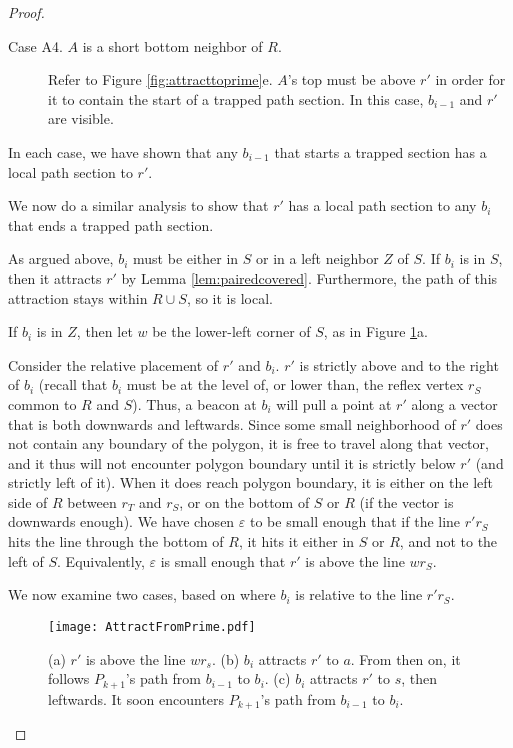 \documentclass{article}
\begin{document}
\begin{proof}
\begin{description}
		\item[Case A4. $A$ is a short bottom neighbor of $R$.]
			Refer to Figure \ref{fig:attracttoprime}e. 
			$A$'s top must be above $r'$ in order
			for it to contain the start of a trapped path section.
			In this case, $b_{i-1}$ and $r'$ are visible.
		\end{description}
		
		In each case, we have shown that any $b_{i-1}$ that starts a trapped section
		has a local path section to $r'$.
		
		We now do a similar analysis to show that $r'$ has a local path section to
		any $b_i$ that ends a trapped path section.
		
		As argued above, $b_i$ must be either in $S$ or in a left neighbor $Z$ of $S$.
		If $b_i$ is in $S$, then it attracts $r'$ by Lemma \ref{lem:pairedcovered}.
		Furthermore, the path of this attraction stays within $R \cup S$, so it is
		local.
		
		If $b_i$ is in $Z$, then 
		let $w$ be the lower-left corner of $S$, as in Figure
		\ref{fig:attractfromprime}a.
		
		Consider the relative placement of $r'$ and $b_i$.
		$r'$ is strictly above and to the right of $b_i$
		(recall that $b_i$ must be at the level of, or lower than,
		the reflex vertex $r_S$ common to $R$ and $S$).
		Thus, a beacon at $b_i$ will pull a point at $r'$ along a vector
		that is both downwards and leftwards.
		Since some small neighborhood of $r'$ does not contain any boundary of the
		polygon,
		it is free to travel along that vector, and it thus will not encounter
		polygon boundary until it is strictly below $r'$ (and strictly left of it).
		When it does reach polygon boundary, it is either on the left side of $R$
		between $r_T$ and $r_S$, or on the bottom of $S$ or $R$ (if the vector is
		downwards enough).  We have chosen $\varepsilon$ to be small enough that if
		the line $r'r_S$ hits the line through the bottom of $R$, it hits it 
		either in $S$ or $R$, and not to the left of $S$.
		Equivalently, $\varepsilon$ is small enough that $r'$ is above the line
		$wr_S$.
		
		We now examine two cases, based on where $b_i$ is relative to the line $r'r_S$.
		
		\begin{figure}[htbp] 
			\begin{center}
				\texttt{[image: AttractFromPrime.pdf]} 
			\end{center}
			\caption{
				(a) $r'$ is above the line $wr_s$. 
				(b) $b_i$ attracts $r'$ to $a$.  From then on, it follows $P_{k+1}$'s
					path from $b_{i-1}$ to $b_i$.
				(c) $b_i$ attracts $r'$ to $s$, then leftwards.  It soon encounters $P_{k+1}$'s
					path from $b_{i-1}$ to $b_i$.
			}
			\label{fig:attractfromprime}
		\end{figure}
		

\end{proof}
\end{document}
